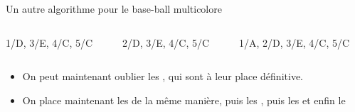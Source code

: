 \documentclass[final,hyperref={pdfpagelabels=false}]{beamer}
\renewenvironment{Coupe}{   }{   }
\begin{document}
\begin{Coupe}
\begin{frame}{Un autre algorithme pour le base-ball multicolore}
\begin{columns}
\begin{column}{.15\linewidth}
                    {1/D,      3/E, 4/C, 5/C}
    \end{column}    
    \begin{column}{.15\linewidth}\center
                    {     2/D, 3/E, 4/C, 5/C}
    \end{column}    
    \begin{column}{.15\linewidth}\center
                    {1/A, 2/D, 3/E, 4/C, 5/C}
    \end{column}    
  \end{columns}

  \begin{itemize}
  \item On peut maintenant oublier les , qui sont à leur place définitive.
  \item On place maintenant les  de la même manière, puis les ,
    puis les  et enfin le 
  \end{itemize}
\end{frame}
\end{Coupe}
\end{document}
